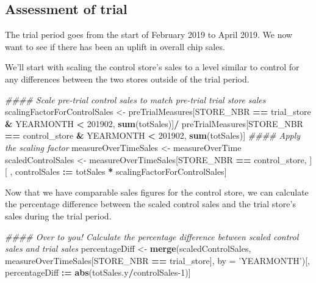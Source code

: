 \documentclass[]{article}
\newenvironment{Shaded}{\begin{snugshade}}{\end{snugshade}}
\newcommand{\CommentTok}[1]{\textcolor[rgb]{0.56,0.35,0.01}{\textit{#1}}}
\newcommand{\DataTypeTok}[1]{\textcolor[rgb]{0.13,0.29,0.53}{#1}}
\newcommand{\DecValTok}[1]{\textcolor[rgb]{0.00,0.00,0.81}{#1}}
\newcommand{\ErrorTok}[1]{\textcolor[rgb]{0.64,0.00,0.00}{\textbf{#1}}}
\newcommand{\KeywordTok}[1]{\textcolor[rgb]{0.13,0.29,0.53}{\textbf{#1}}}
\newcommand{\NormalTok}[1]{#1}
\newcommand{\OperatorTok}[1]{\textcolor[rgb]{0.81,0.36,0.00}{\textbf{#1}}}
\newcommand{\StringTok}[1]{\textcolor[rgb]{0.31,0.60,0.02}{#1}}
\begin{document}
\hypertarget{assessment-of-trial}{%
\subsection{Assessment of trial}\label{assessment-of-trial}}

The trial period goes from the start of February 2019 to April 2019. We
now want to see if there has been an uplift in overall chip sales.

We'll start with scaling the control store's sales to a level similar to
control for any differences between the two stores outside of the trial
period.

\begin{Shaded}
\begin{Highlighting}[]
\CommentTok{#### Scale pre-trial control sales to match pre-trial trial store sales}
\NormalTok{scalingFactorForControlSales <-}\StringTok{ }\NormalTok{preTrialMeasures[STORE_NBR }\OperatorTok{==}\StringTok{ }\NormalTok{trial_store }\OperatorTok{&}\StringTok{ }\NormalTok{YEARMONTH }\OperatorTok{<}\StringTok{ }\DecValTok{201902}\NormalTok{,}
                                                 \KeywordTok{sum}\NormalTok{(totSales)]}\OperatorTok{/}
\StringTok{                                }\NormalTok{preTrialMeasures[STORE_NBR }\OperatorTok{==}\StringTok{ }\NormalTok{control_store }\OperatorTok{&}\StringTok{ }\NormalTok{YEARMONTH }\OperatorTok{<}\StringTok{ }\DecValTok{201902}\NormalTok{,}
                                                 \KeywordTok{sum}\NormalTok{(totSales)]}
\CommentTok{#### Apply the scaling factor}
\NormalTok{measureOverTimeSales <-}\StringTok{ }\NormalTok{measureOverTime}
\NormalTok{scaledControlSales <-}\StringTok{ }\NormalTok{measureOverTimeSales[STORE_NBR }\OperatorTok{==}\StringTok{ }\NormalTok{control_store, }
\NormalTok{                                           ][ , controlSales }\OperatorTok{:}\ErrorTok{=}\StringTok{ }\NormalTok{totSales }\OperatorTok{*}
\StringTok{                                                }\NormalTok{scalingFactorForControlSales]}
\end{Highlighting}
\end{Shaded}

Now that we have comparable sales figures for the control store, we can
calculate the percentage difference between the scaled control sales and
the trial store's sales during the trial period.

\begin{Shaded}
\begin{Highlighting}[]
\CommentTok{#### Over to you! Calculate the percentage difference between scaled control sales and trial sales}
\NormalTok{percentageDiff <-}\StringTok{ }\KeywordTok{merge}\NormalTok{(scaledControlSales, measureOverTimeSales[STORE_NBR }\OperatorTok{==}\StringTok{ }\NormalTok{trial_store], }
                        \DataTypeTok{by =} \StringTok{'YEARMONTH'}\NormalTok{)[, percentageDiff }\OperatorTok{:}\ErrorTok{=}\StringTok{ }\KeywordTok{abs}\NormalTok{(totSales.y}\OperatorTok{/}\NormalTok{controlSales}\DecValTok{-1}\NormalTok{)]}
\end{Highlighting}
\end{Shaded}
\end{document}
